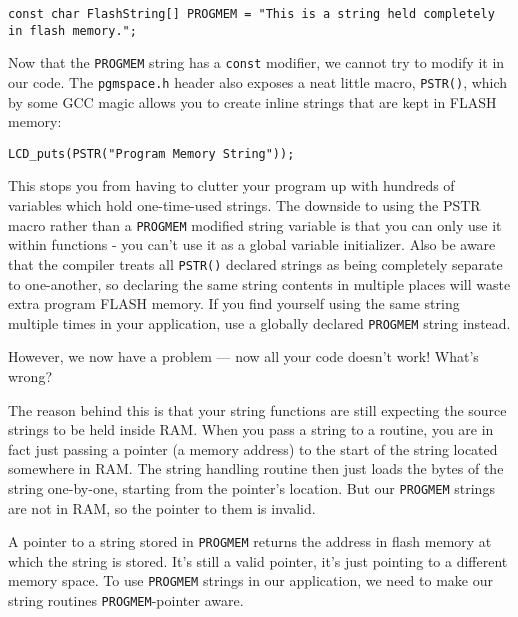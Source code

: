 \documentclass[a4paper,oneside,notitlepage]{book}
\begin{document}
\begin{center}
\begin{lstlisting}
const char FlashString[] PROGMEM = "This is a string held completely in flash memory.";
\end{lstlisting}
\end{center}

Now that the \lstinline{PROGMEM} string has a \lstinline{const} modifier, we cannot try to modify it in our code. The \lstinline{pgmspace.h} header also exposes a neat little macro, \lstinline{PSTR()}, which by some GCC magic allows you to create inline strings that are kept in FLASH memory:

\begin{center}
\begin{lstlisting}
LCD_puts(PSTR("Program Memory String"));
\end{lstlisting}
\end{center}

This stops you from having to clutter your program up with hundreds of variables which hold one-time-used strings. The downside to using the PSTR macro rather than a \lstinline{PROGMEM} modified string variable is that you can only use it within functions - you can't use it as a global variable initializer. Also be aware that the compiler treats all \lstinline{PSTR()} declared strings as being completely separate to one-another, so declaring the same string contents in multiple places will waste extra program FLASH memory. If you find yourself using the same string multiple times in your application, use a globally declared \lstinline{PROGMEM} string instead.

However, we now have a problem --- now all your code doesn't work! What's wrong?


The reason behind this is that your string functions are still expecting the source strings to be held inside RAM. When you pass a string to a routine, you are in fact just passing a pointer (a memory address) to the start of the string located somewhere in RAM. The string handling routine then just loads the bytes of the string one-by-one, starting from the pointer's location. But our \lstinline{PROGMEM} strings are not in RAM, so the pointer to them is invalid.

A pointer to a string stored in \lstinline{PROGMEM} returns the address in flash memory at which the string is stored. It's still a valid pointer, it's just pointing to a different memory space. To use \lstinline{PROGMEM} strings in our application, we need to make our string routines \lstinline{PROGMEM}-pointer aware.
\end{document}
